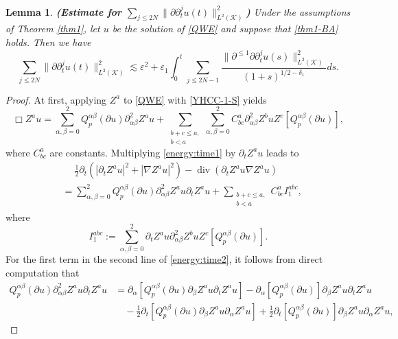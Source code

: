 \documentclass[11pt,twoside]{article}
\def\cK{\mathcal K}
\def\ds{\displaystyle}
\def\p{\partial}
\def\ve{\varepsilon}
\def\dive{\operatorname{div}}
\def\ls{\lesssim}
\theoremstyle{plain}
\newtheorem{lemma}[theorem]{Lemma}
\theoremstyle{definition}
\numberwithin{equation}{section}
\begin{document}
\begin{lemma}\label{Son-4.1}
{\bf (Estimate for $\ds\sum_{j\le2N}\|\p\p_t^ju(t)\|^2_{L^2(\cK)}$)}
Under the assumptions of Theorem \ref{thm1}, let $u$ be the solution of \eqref{QWE} and suppose that \eqref{thm1-BA} holds.
Then we have
\begin{equation}\label{thm1-energy:time}
\sum_{j\le2N}\|\p\p_t^ju(t)\|^2_{L^2(\cK)}
\ls\ve^2+\ve_1\int_0^t\sum_{j\le2N-1}\frac{\|\p^{\le1}\p\p_t^ju(s)\|^2_{L^2(\cK)}}{(1+s)^{1/2-\delta_1}}ds.
\end{equation}
\end{lemma}
\begin{proof}
At first, applying $Z^a$ to \eqref{QWE} with \eqref{YHCC-1-S} yields
\begin{equation}\label{energy:time1}
\Box Z^au=\sum_{\alpha,\beta=0}^2Q_p^{\alpha\beta}(\p u)\p^2_{\alpha\beta}Z^au
+\sum_{\substack{b+c\le a,\\b<a}}\sum_{\alpha,\beta=0}^2C^a_{bc}\p^2_{\alpha\beta}Z^bu Z^c[Q_p^{\alpha\beta}(\p u)],
\end{equation}
where $C^a_{bc}$ are constants.
Multiplying \eqref{energy:time1} by $\p_tZ^au$ leads to
\begin{equation}\label{energy:time2}
\begin{split}
&\quad\;\frac12\p_t(|\p_tZ^au|^2+|\nabla Z^au|^2)-\dive(\p_tZ^au\nabla Z^au)\\
&=\sum_{\alpha,\beta=0}^2Q_p^{\alpha\beta}(\p u)\p^2_{\alpha\beta}Z^au\p_tZ^au
+\sum_{\substack{b+c\le a,\\b<a}}C^a_{bc}I_1^{abc},
\end{split}
\end{equation}
where
\begin{equation}\label{energy:time3}
I_1^{abc}:=\sum_{\alpha,\beta=0}^2\p_tZ^au\p^2_{\alpha\beta}Z^bu Z^c[Q_p^{\alpha\beta}(\p u)].
\end{equation}
For the first term in the second line of \eqref{energy:time2}, it follows from direct computation that
\begin{equation}\label{energy:time4}
\begin{split}
Q_p^{\alpha\beta}(\p u)\p^2_{\alpha\beta}Z^au\p_tZ^au&=\p_{\alpha}[Q_p^{\alpha\beta}(\p u)\p_{\beta}Z^au\p_tZ^au]
-\p_{\alpha}[Q_p^{\alpha\beta}(\p u)]\p_{\beta}Z^au\p_tZ^au\\
&\quad-\frac12\p_t[Q_p^{\alpha\beta}(\p u)\p_{\beta}Z^au\p_{\alpha}Z^au]
+\frac12\p_t[Q_p^{\alpha\beta}(\p u)]\p_{\beta}Z^au\p_{\alpha}Z^au,
\end{split}
\end{equation}

\end{proof}
\end{document}
